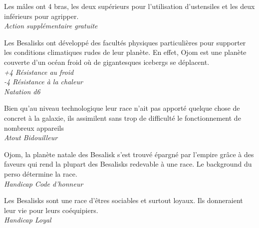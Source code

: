 \begin{description}[align=left]
\item [A bras le corps]         %
    Les mâles ont 4 bras, les deux supérieurs pour l’utilisation d’ustensiles et les deux inférieurs pour agripper.\\
    \textit{Action supplémentaire gratuite}

\item [Pas frileux]             %
    Les Besalisks ont développé des facultés physiques particulières pour supporter les conditions climatiques rudes de leur planète. En effet, Ojom est une planète couverte d’un océan froid où de gigantesques icebergs se déplacent.\\
    \textit{+4 Résistance au froid}\\
    \textit{-4 Résistance à la chaleur}\\
    \textit{Natation d6}

\item [Bricoleur]               %
    Bien qu’au niveau technologique leur race n’ait pas apporté quelque chose de concret à la galaxie, ils assimilent sans trop de difficulté le fonctionnement de nombreux appareils\\
    \textit{Atout Bidouilleur}

\item [Dette de Liberté]        %
    Ojom, la planète natale des Besalisk s’est trouvé épargné par l’empire grâce à des faveurs qui rend la plupart des Besalisks redevable à une race. Le background du perso détermine la race.\\
    \textit{Handicap Code d’honneur}

\item [Loyal]                   %
    Les Besalisks sont une race d’êtres sociables et surtout loyaux. Ils donneraient leur vie pour leurs coéquipiers.\\
    \textit{Handicap Loyal}
\end{description}
\newpage
